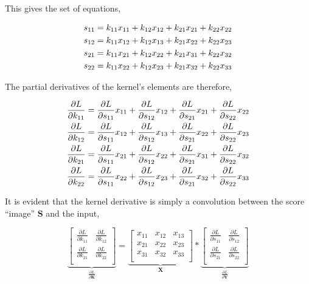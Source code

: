 \documentclass[11pt]{amsart}
\begin{document}
This gives the set of equations,

\begin{align}
s_{11} &= k_{11}x_{11} + k_{12}x_{12} + k_{21}x_{21} + k_{22}x_{22}\notag \\
s_{12} &= k_{11}x_{12} + k_{12}x_{13} + k_{21}x_{22} + k_{22}x_{23}\notag \\
s_{21} &= k_{11}x_{21} + k_{12}x_{22} + k_{21}x_{31} + k_{22}x_{32}\notag \\
s_{22} &= k_{11}x_{22} + k_{12}x_{23} + k_{21}x_{32} + k_{22}x_{33}\notag
\end{align}

The partial derivatives of the kernel's elements are therefore,

\begin{align}
\frac{\partial{L}}{\partial{k_{11}}} &= \frac{\partial{L}}{\partial{s_{11}}}x_{11} + \frac{\partial{L}}{\partial{s_{12}}}x_{12} + \frac{\partial{L}}{\partial{s_{21}}}x_{21} + \frac{\partial{L}}{\partial{s_{22}}}x_{22}\notag \\
\frac{\partial{L}}{\partial{k_{12}}} &= \frac{\partial{L}}{\partial{s_{11}}}x_{12} + \frac{\partial{L}}{\partial{s_{12}}}x_{13} + \frac{\partial{L}}{\partial{s_{21}}}x_{22} + \frac{\partial{L}}{\partial{s_{22}}}x_{23}\notag \\
\frac{\partial{L}}{\partial{k_{21}}} &= \frac{\partial{L}}{\partial{s_{11}}}x_{21} + \frac{\partial{L}}{\partial{s_{12}}}x_{22} + \frac{\partial{L}}{\partial{s_{21}}}x_{31} + \frac{\partial{L}}{\partial{s_{22}}}x_{32}\notag \\
\frac{\partial{L}}{\partial{k_{22}}} &= \frac{\partial{L}}{\partial{s_{11}}}x_{22} + \frac{\partial{L}}{\partial{s_{12}}}x_{23} + \frac{\partial{L}}{\partial{s_{21}}}x_{32} + \frac{\partial{L}}{\partial{s_{22}}}x_{33}\notag
\end{align}

It is evident that the kernel derivative is simply a convolution between the score ``image'' $\mathbf{S}$ and the input,

$$
\underbrace{\begin{bmatrix}
\frac{\partial{L}}{\partial{k_{11}}} & \frac{\partial{L}}{\partial{k_{12}}} \\
\frac{\partial{L}}{\partial{k_{21}}} & \frac{\partial{L}}{\partial{k_{22}}} \\
\end{bmatrix}}_{\frac{\partial L}{\partial\mathbf{K}}}
=
\underbrace{\begin{bmatrix}
x_{11} & x_{12} & x_{13} \\
x_{21} & x_{22} & x_{23} \\
x_{31} & x_{32} & x_{33} \\
\end{bmatrix}}_{\mathbf{X}} *
\underbrace{\begin{bmatrix}
\frac{\partial{L}}{\partial{s_{11}}} & \frac{\partial{L}}{\partial{s_{12}}} \\
\frac{\partial{L}}{\partial{s_{21}}} & \frac{\partial{L}}{\partial{s_{22}}} \\
\end{bmatrix}}_{\frac{\partial L}{\partial\mathbf{Y}}}
$$
\end{document}
